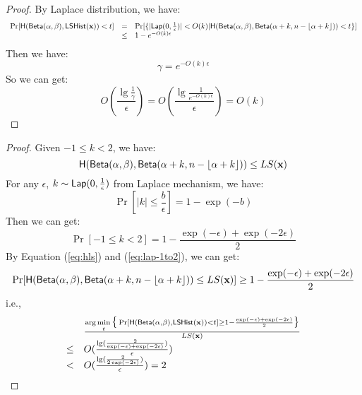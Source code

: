 \documentclass{article}
\begin{document}
%
%
\begin{proof}
By Laplace distribution, we have:
\[
\begin{array}{lcl}
	 \Pr[\mathsf{H}(\mathsf{Beta}(\alpha, \beta), \mathsf{LSHist}(\textbf{x}))< t]
	 & = & 
	 \Pr[\{|\mathsf{Lap}(0, \frac{1}{\epsilon})|< O(k) |
	 \mathsf{H}(\mathsf{Beta}(\alpha, \beta), \mathsf{Beta}(\alpha + k, n - \lfloor \alpha + k \rfloor)) < t \}]\\
	 & \leq & 1 - e^{- O(k)\epsilon} \\
\end{array}
\]
Then we have:
\[
	\gamma = e^{- O(k)\epsilon}
\]
So we can get:
\[
	O(\frac{\lg{\frac{1}{\gamma}}}{\epsilon})
	= O(\frac{\lg{\frac{1}{e^{- O(k)\epsilon}}}}{\epsilon})
	= O(k)
\]
%
\end{proof}
%
%
%
%
%
\begin{proof}
Given $ -1 \leq k < 2$, we have: 
\begin{equation}
\label{eq:hls}
\mathsf{H}(\mathsf{Beta}(\alpha, \beta), \mathsf{Beta}(\alpha + k, n - \lfloor \alpha + k \rfloor)) \leq LS(\textbf{x})
\end{equation}
For any $\epsilon$, $k \sim \mathsf{Lap}(0, \frac{1}{\epsilon})$ from Laplace mechanism, we have:
\[
\Pr[|k| \leq \frac{b}{\epsilon}] = 1 - \exp(-b)
\]
Then we can get:
\begin{equation}
\label{eq:lap-1to2}
\Pr[ -1 \leq k < 2] = 1 - \frac{\exp(-\epsilon) + \exp(-2\epsilon)}{2}
\end{equation}
By Equation (\ref{eq:hls}) and (\ref{eq:lap-1to2}), we can get:
\[
\Pr[\mathsf{H}(\mathsf{Beta}(\alpha, \beta), \mathsf{Beta}(\alpha + k, n - \lfloor \alpha + k \rfloor)) \leq LS(\textbf{x})] \geq 1 - \frac{\exp(-\epsilon) + \exp(-2\epsilon)}{2}
\]
i.e.,
\[
\begin{array}{ll}
	 &	\frac{\arg\min\limits_{t}\big\{\Pr[\mathsf{H}(\mathsf{Beta}(\alpha, \beta), \mathsf{LSHist}(\textbf{x}))< t] \geq 1 - \frac{\exp(-\epsilon) + \exp(-2\epsilon)}{2} \big\} }
	 {	LS(\textbf{x})	}\\
\leq & 	O(\frac{\lg( \frac{2}{\exp(-\epsilon) + \exp(-2\epsilon)})}{\epsilon})\\
<    & O(\frac{\lg( \frac{2}{2 \exp(-2\epsilon)})}{\epsilon}) = 2
\end{array}
\]
\end{proof}
\end{document}
